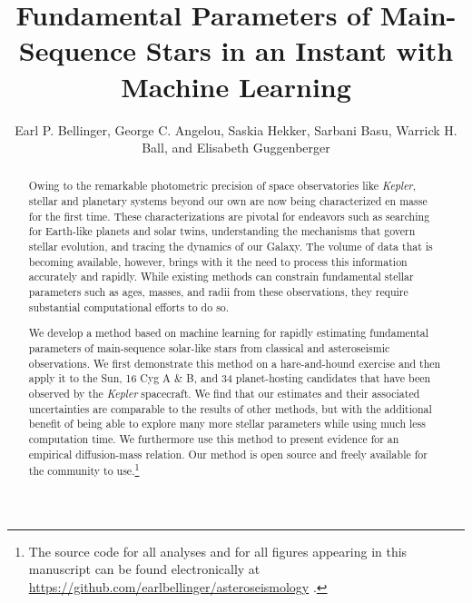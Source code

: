 \documentclass[twocolumn,twocolappendix]{aastex6}
\newif\ifref
\newcommand{\mb}[1]{\ifref\boldmath\textbf{#1}\unboldmath\else #1\fi}
\begin{document}
\title{Fundamental Parameters of Main-Sequence Stars in an Instant with Machine Learning}

\author{Earl P. Bellinger, George C. Angelou, Saskia Hekker, Sarbani Basu, Warrick H. Ball, and Elisabeth Guggenberger}

\begin{abstract}
Owing to the remarkable photometric precision of space observatories like \emph{Kepler}, stellar and planetary systems beyond our own are now being characterized en masse for the first time. These characterizations are pivotal for endeavors such as searching for Earth-like planets and solar twins, understanding the mechanisms that govern stellar evolution, and tracing the dynamics of our Galaxy. The volume of data that is becoming available, however, brings with it the need to process this information accurately and rapidly. While existing methods can constrain \mb{fundamental stellar parameters such as ages, masses, and radii} from these observations, they require substantial computational efforts to do so. 

We develop a method based on machine learning for rapidly estimating fundamental parameters of main-sequence solar-like stars from classical and asteroseismic observations. We first demonstrate this method on a hare-and-hound exercise and then apply it to the Sun, 16 Cyg A \& B, and 34 planet-hosting candidates that have been observed by the \emph{Kepler} spacecraft. We find that our estimates and their associated uncertainties are comparable to the results of other methods, but with the additional benefit of being able to explore many more stellar parameters while using much less computation time. We furthermore use this method to present evidence for an empirical diffusion-mass relation. Our method is open source and freely available for the community to use.\footnote{The source code for all analyses and for all figures appearing in this manuscript can be found electronically at \url{https://github.com/earlbellinger/asteroseismology} \citep{earl_bellinger_2016_55400}.}
\end{abstract}
\end{document}
